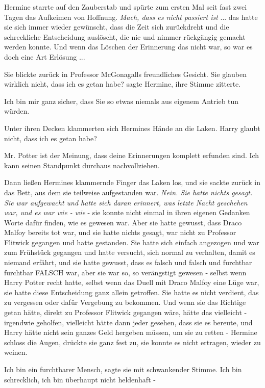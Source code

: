 Hermine starrte auf den Zauberstab und spürte zum ersten Mal seit fast zwei
Tagen das Aufkeimen von Hoffnung. \emph{Mach, dass es nicht passiert ist} ...
das hatte sie sich immer wieder gewünscht, dass die Zeit sich zurückdreht und
die schreckliche Entscheidung auslöscht, die nie und nimmer rückgängig gemacht
werden konnte. Und wenn das Löschen der Erinnerung das nicht war, so war es doch
eine Art Erlösung ...

Sie blickte zurück in Professor McGonagalls freundliches Gesicht. \glqq{}Sie
glauben wirklich nicht, dass ich es getan habe?\grqq{} sagte Hermine, ihre
Stimme zitterte.

\glqq{}Ich bin mir ganz sicher, dass Sie so etwas niemals aus eigenem Antrieb tun
würden.\grqq{}

Unter ihren Decken klammerten sich Hermines Hände an die Laken. \glqq{}Harry
glaubt nicht, dass ich es getan habe?\grqq{}

\glqq{}Mr. Potter ist der Meinung, dass deine Erinnerungen komplett erfunden
sind. Ich kann seinen Standpunkt durchaus nachvollziehen.\grqq{}

Dann ließen Hermines klammernde Finger das Laken los, und sie sackte zurück in
das Bett, aus dem sie teilweise aufgestanden war. \emph{Nein. Sie hatte nichts
gesagt. Sie war aufgewacht und hatte sich daran erinnert, was letzte Nacht
geschehen war, und es war wie - wie} - sie konnte nicht einmal in ihren eigenen
Gedanken Worte dafür finden, wie es gewesen war. Aber sie hatte gewusst, dass
Draco Malfoy bereits tot war, und sie hatte nichts gesagt, war nicht zu
Professor Flitwick gegangen und hatte gestanden. Sie hatte sich einfach
angezogen und war zum Frühstück gegangen und hatte versucht, sich normal zu
verhalten, damit es niemand erfährt, und sie hatte gewusst, dass es falsch und
falsch und furchtbar furchtbar FALSCH war, aber sie war so, so verängstigt
gewesen - selbst wenn Harry Potter recht hatte, selbst wenn das Duell mit Draco
Malfoy eine Lüge war, sie hatte diese Entscheidung ganz allein getroffen. Sie
hatte es nicht verdient, das zu vergessen oder dafür Vergebung zu bekommen. Und
wenn sie das Richtige getan hätte, direkt zu Professor Flitwick gegangen wäre,
hätte das vielleicht - irgendwie geholfen, vielleicht hätte dann jeder gesehen,
dass sie es bereute, und Harry hätte nicht sein ganzes Geld hergeben müssen, um
sie zu retten - Hermine schloss die Augen, drückte sie ganz fest zu, sie konnte
es nicht ertragen, wieder zu weinen.

\glqq{}Ich bin ein furchtbarer Mensch\grqq{}, sagte sie mit schwankender Stimme.
\glqq{}Ich bin schrecklich, ich bin überhaupt nicht heldenhaft -\grqq{}


